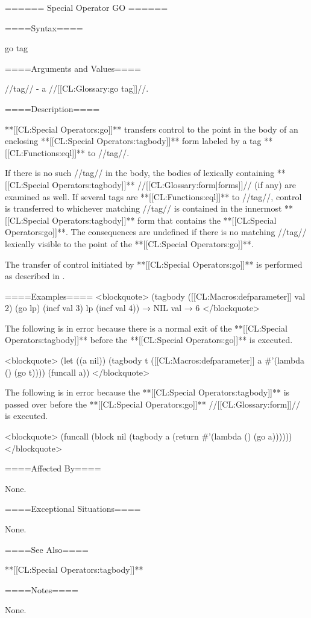 ====== Special Operator GO ======

====Syntax====

\DefspecNoReturn go {tag}

====Arguments and Values====

//tag// - a //[[CL:Glossary:go tag]]//.

====Description====

**[[CL:Special Operators:go]]** transfers control to the point in the body of an enclosing **[[CL:Special Operators:tagbody]]** form labeled by a tag **[[CL:Functions:eql]]** to //tag//.

If there is no such //tag// in the body, the bodies of lexically containing **[[CL:Special Operators:tagbody]]** //[[CL:Glossary:form|forms]]// (if any) are examined as well. If several tags are **[[CL:Functions:eql]]** to //tag//, control is transferred to whichever matching //tag// is contained in the innermost **[[CL:Special Operators:tagbody]]** form that contains the **[[CL:Special Operators:go]]**. The consequences are undefined if there is no matching //tag// lexically visible to the point of the **[[CL:Special Operators:go]]**.

The transfer of control initiated by **[[CL:Special Operators:go]]** is performed as described in \secref\TransferOfControl.

====Examples==== <blockquote> (tagbody ([[CL:Macros:defparameter]] val 2) (go lp) (incf val 3) lp (incf val 4)) → NIL val → 6 </blockquote>



The following is in error because there is a normal exit of the **[[CL:Special Operators:tagbody]]** before the **[[CL:Special Operators:go]]** is executed.

<blockquote> (let ((a nil)) (tagbody t ([[CL:Macros:defparameter]] a #'(lambda () (go t)))) (funcall a)) </blockquote>

The following is in error because the **[[CL:Special Operators:tagbody]]** is passed over before the **[[CL:Special Operators:go]]** //[[CL:Glossary:form]]// is executed.

<blockquote> (funcall (block nil (tagbody a (return #'(lambda () (go a)))))) </blockquote>

====Affected By====

None.

====Exceptional Situations====

None.

====See Also====

**[[CL:Special Operators:tagbody]]**

====Notes====

None.


